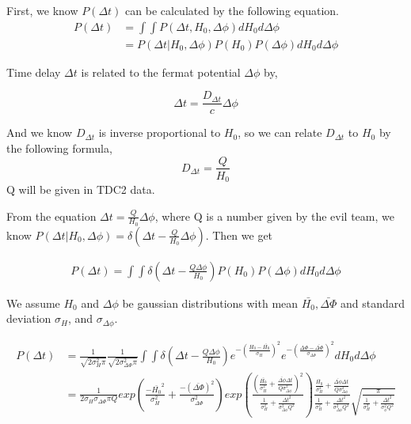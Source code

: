 \documentclass[\docopts]{\docclass}
\begin{document}
First, we know $P(\Delta t)$ can be calculated by the following equation.
\begin{align}
P(\Delta t) &= \int \int P(\Delta t, H_0, \Delta \phi) dH_0 d \Delta \phi \\
&= P(\Delta t | H_0, \Delta \phi) P(H_0)P(\Delta \phi) dH_0 d\Delta \phi
\end{align}

Time delay $\Delta t$ is related to the fermat potential $\Delta \phi$ by,

\begin{equation}
\Delta t = \frac{D_{\Delta t}}{c} \Delta \phi
\end{equation}

And we know $D_{\Delta t}$ is inverse proportional to $H_0$, so we can relate $D_{\Delta t}$ to $H_0$ by the following formula,
\begin{equation}
D_{\Delta t}= \frac{Q}{H_0}
\end{equation}
Q will be given in TDC2 data.

From the equation $\Delta t = \frac{Q}{H_0}\Delta \phi$, where Q is a number given by the evil team, we know
$P(\Delta t | H_0, \Delta \phi) = \delta(\Delta t - \frac{Q}{H_0}\Delta \phi)$.
Then we get

\begin{align}
P(\Delta t) = \int\int \delta(\Delta t - \frac{Q \Delta \phi }{H_0}) P(H_0)P(\Delta \phi) dH_0 d\Delta \phi
\end{align}

We assume $H_0$ and $\Delta \phi$ be gaussian distributions with mean $\bar{H_0}, \bar{\Delta \Phi}$ and standard deviation $\sigma_{H}$, and $\sigma_{\Delta \phi}$.

\begin{align}
P(\Delta t) &= \frac{1}{\sqrt{2\sigma_{H}^2\pi}}\frac{1}{\sqrt{2\sigma_{\Delta \Phi}^2\pi}}\int\int \delta(\Delta t - \frac{Q \Delta \phi}{H_0}) e^{-(\frac{H_0-\bar{H_0}}{\sigma_{H}})^2} e^{-(\frac{\Delta \Phi-\bar{\Delta \Phi}}{\sigma_{\Delta \Phi}})^2} dH_0 d\Delta \phi \\
&= \frac{1}{2\sigma_{H}\sigma_{\Delta \Phi}\pi Q} exp(\frac{-\bar{H_0}^2}{\sigma_H^2}+\frac{-(\bar{\Delta \Phi})^2}{\sigma_{\Delta \Phi}^2})
exp(\frac{(\frac{\bar{H_0}}{\sigma_H^2}+\frac{\bar{\Delta \phi}\Delta t}{Q\sigma_{\Delta \phi}^2})^2}{\frac{1}{\sigma_H^2}+\frac{\Delta t^2}{\sigma_{\Delta \phi}^2 Q^2}}) \frac{\frac{\bar{H_0}}{\sigma_H^2}+\frac{\bar{\Delta \phi}\Delta t}{Q\sigma_{\Delta \phi}^2}}{\frac{1}{\sigma_H^2}+\frac{\Delta t^2}{\sigma_{\Delta\phi}^2 Q^2}}
\sqrt{\frac{\pi}{\frac{1}{\sigma_H^2}+\frac{\Delta t^2}{\sigma_\phi^2Q^2}}}
\end{align}
\end{document}
